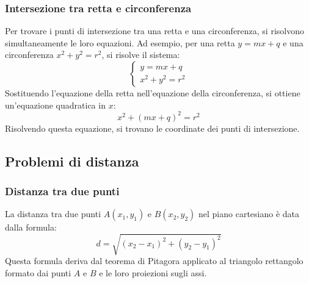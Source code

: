 \documentclass{article}
\begin{document}
\subsubsection{Intersezione tra retta e circonferenza}
Per trovare i punti di intersezione tra una retta e una circonferenza, si risolvono
simultaneamente le loro equazioni. Ad esempio, per una retta \(y = mx + q\) e una
circonferenza \(x^2 + y^2 = r^2\), si risolve il sistema:
\[
    \begin{cases}
    y = mx + q \\
    x^2 + y^2 = r^2
    \end{cases}
\]
Sostituendo l'equazione della retta nell'equazione della circonferenza, si ottiene
un'equazione quadratica in \(x\):
\[
    x^2 + (mx + q)^2 = r^2
\]
Risolvendo questa equazione, si trovano le coordinate dei punti di intersezione.


\newpage
\subsection{Problemi di distanza}

\subsubsection{Distanza tra due punti}
La distanza tra due punti \(A(x_1, y_1)\) e \(B(x_2, y_2)\) nel piano cartesiano è data dalla
formula:
\[
    d = \sqrt{(x_2 - x_1)^2 + (y_2 - y_1)^2}
\]
Questa formula deriva dal teorema di Pitagora applicato al triangolo rettangolo formato dai
punti \(A\) e \(B\) e le loro proiezioni sugli assi.

\end{document}
